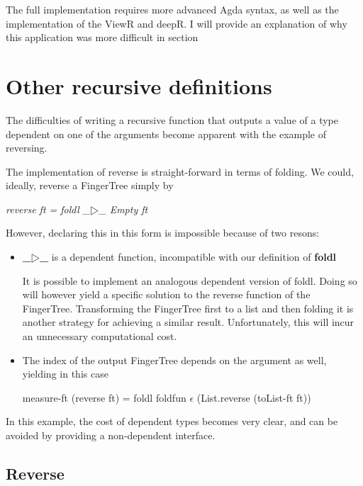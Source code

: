 \documentclass[12pt,twoside,notitlepage]{report}
\begin{document}
The full implementation requires more advanced Agda syntax, as well as the implementation of the ViewR and deepR. I will provide an explanation of why this application was more difficult in section \cite{eval:lemma}

\section{Other recursive definitions}

The difficulties of writing a recursive function that outputs a value of a type dependent on one of the arguments become apparent with the example of reversing.

The implementation of reverse is straight-forward in terms of folding. We could, ideally, reverse a FingerTree simply by 

\begin{center}
\textit{reverse ft = foldl \_$▷$\_ Empty ft}
\end{center}

However, declaring this in this form is impossible because of two resons:

\begin{itemize}
\item \textbf{\_$▷$\_} is a dependent function, incompatible with our definition of \textbf{foldl} \cite{foldl}

It is possible to implement an analogous dependent version of foldl. Doing so will however yield a specific solution to the reverse function of the FingerTree.
Transforming the FingerTree first to a list and then folding it is another strategy for achieving a similar result. Unfortunately, this will incur an unnecessary computational cost.
 
\item The index of the output FingerTree depends on the argument as well, yielding in this case 
\begin{center}
measure-ft (reverse ft) = foldl foldfun $\epsilon$ (List.reverse (toList-ft ft))
\end{center}
\end{itemize}

In this example, the cost of dependent types becomes very clear, and can be avoided by providing a non-dependent interface.

\subsection{Reverse}
\end{document}
